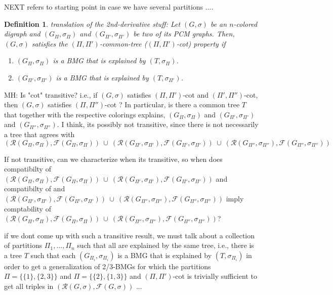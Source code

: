 \documentclass[final,3p,times]{elsarticle}
\newtheorem{definition}{Definition}[section]
\newcommand{\TODO}[1]{\begingroup\color{red}#1\endgroup}
\newcommand{\mh}[1]{\begingroup\color{blue}#1\endgroup}
\begin{document}
\TODO{\bigskip \bigskip NEXT refers to starting point in case we have several partitions .... }
\begin{definition}\TODO{translation of the 2nd-derivative stuff:}
\mh{
Let $(G,\sigma)$ be an $n$-colored digraph 
and $(G_{\Pi},\sigma_{\Pi})$ and $(G_{\Pi'},\sigma_{\Pi'})$ 
be two of its PCM graphs. 
Then, $(G,\sigma)$ satisfies the $(\Pi,\Pi')$-common-tree ($(\Pi,\Pi')$-cot) property
if 
\begin{enumerate}
	\item $(G_{\Pi},\sigma_{\Pi})$ is a BMG that is explained by $(T,\sigma_{\Pi})$.
	\item $(G_{\Pi'},\sigma_{\Pi'})$ is a BMG that is explained by $(T,\sigma_{\Pi'})$.
\end{enumerate}
}
\end{definition}

\TODO{MH: Is "cot" transitive? i.e., if $(G,\sigma)$ satisfies $(\Pi,\Pi')$-cot and $(\Pi',\Pi'')$-cot, then 
		$(G,\sigma)$ satisfies $(\Pi,\Pi'')$-cot ? In particular, 
		is there a common tree $T$ that together with the respective colorings explains, 
		$(G_{\Pi},\sigma_{\Pi})$ 
		and $(G_{\Pi'},\sigma_{\Pi'})$ and
		$(G_{\Pi''},\sigma_{\Pi''})$. I think, its possibly not transitive,  since
		there is not necessarily a tree that agrees with
		$$(\mathscr{R}(G_{\Pi},\sigma_{\Pi}),\mathscr{F}(G_{\Pi},\sigma_{\Pi}))\ \cup\ 
		(\mathscr{R}(G_{\Pi'},\sigma_{\Pi'}),\mathscr{F}(G_{\Pi'},\sigma_{\Pi'}))\ \cup\ 
		(\mathscr{R}(G_{\Pi''},\sigma_{\Pi''}),\mathscr{F}(G_{\Pi''},\sigma_{\Pi''}))$$
		


If not transitive, can we characterize when its transitive, so when 
does compatibilty of  $(\mathscr{R}(G_{\Pi},\sigma_{\Pi}),\mathscr{F}(G_{\Pi},\sigma_{\Pi}))\ \cup\ 
		(\mathscr{R}(G_{\Pi'},\sigma_{\Pi'}),\mathscr{F}(G_{\Pi'},\sigma_{\Pi'}))$
		and compatibilty of 
		and $
		(\mathscr{R}(G_{\Pi'},\sigma_{\Pi'}),\mathscr{F}(G_{\Pi'},\sigma_{\Pi'}))\ \cup\ 
		(\mathscr{R}(G_{\Pi''},\sigma_{\Pi''}),\mathscr{F}(G_{\Pi''},\sigma_{\Pi''}))$
		imply comptability of 
		$(\mathscr{R}(G_{\Pi},\sigma_{\Pi}),\mathscr{F}(G_{\Pi},\sigma_{\Pi}))\ \cup\ 
		(\mathscr{R}(G_{\Pi''},\sigma_{\Pi''}),\mathscr{F}(G_{\Pi''},\sigma_{\Pi''}))$?
		

if we dont come up with such a transitive result, 
we must talk about a collection of partitions $\Pi_1,\dots,\Pi_n$
such that all are explained by the same tree, i.e.,  there is a tree $T$ such
that each $(G_{\Pi_i},\sigma_{\Pi_i})$ is a BMG that is explained by $(T,\sigma_{\Pi_i})$
in order to get a generalization of 2/3-BMGs for which 
the partitions $\Pi = \{\{1\}, \{2,3\}\}$ and  $\Pi = \{\{2\}, \{1,3\}\}$ 
and $(\Pi,\Pi')$-cot is trivially sufficient to get all triples
in $(\mathscr{R}(G,\sigma),\mathscr{F}(G,\sigma))$ ... 
}	 
	 
\end{document}
